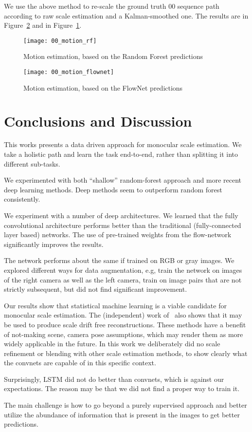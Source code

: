 We use the above method to re-scale the ground truth 00 sequence path
according to raw scale estimation and a Kalman-smoothed one.  The
results are in Figure~\ref{fig:00_motion} and in
Figure~\ref{fig:00_motion_rf}.

\begin{figure}[!ht]
  \centering
  \texttt{[image: 00\_motion\_rf]}
  \caption{Motion estimation, based on the Random Forest predictions}
  \label{fig:00_motion_rf}
\end{figure}

\begin{figure}[!ht]
  \centering
  \texttt{[image: 00\_motion\_flownet]}
  \caption{Motion estimation, based on the FlowNet predictions}
  \label{fig:00_motion}
\end{figure}

\section{Conclusions and Discussion}

This works presents a data driven approach for monocular scale
estimation.  We take a holistic path and learn the task end-to-end,
rather than splitting it into different sub-tasks.

We experimented with both ``shallow'' random-forest approach and more
recent deep learning methods.  Deep methods seem to outperform random
forest consistently.

We experiment with a number of deep architectures. We learned that the
fully convolutional architecture performs better than the traditional
(fully-connected layer based) networks.  The use of pre-trained weights
from the flow-network significantly improves the results.

The network performs about the same if trained on RGB or gray images.
We explored different ways for data augmentation, e.g, train the
network on images of the right camera as well as the left camera,
train on image pairs that are not strictly subsequent, but did not
find significant improvement.

Our results show that statistical machine learning is a viable
candidate for monocular scale estimation.  The (independent) work
of~\cite{frost2017using} also shows that it may be used to produce scale
drift free reconstructions.  These methods have a benefit of not-making
scene, camera pose assumptions, which may render them as more widely
applicable in the future.  In this work we deliberately did no scale
refinement or blending with other scale estimation methods, to show
clearly what the convnets are capable of in this specific context.

Surprisingly, LSTM did not do better than convnets, which is against
our expectations. The reason may be that we did not find a proper way
to train it.

The main challenge is how to go beyond a purely supervised approach
and better utilize the abundance of information that is present in the
images to get better predictions.

